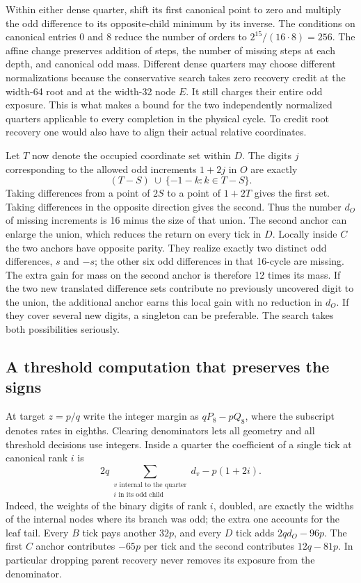 Within either dense quarter, shift its first canonical point to zero and multiply the odd difference to its opposite-child minimum by its inverse. The conditions on canonical entries 0 and 8 reduce the number of orders to \(2^{15}/(16\cdot8)=256\). The affine change preserves addition of steps, the number of missing steps at each depth, and canonical odd mass. Different dense quarters may choose different normalizations because the conservative search takes zero recovery credit at the width-64 root and at the width-32 node \(E\). It still charges their entire odd exposure. This is what makes a bound for the two independently normalized quarters applicable to every completion in the physical cycle. To credit root recovery one would also have to align their actual relative coordinates.

Let \(T\) now denote the occupied coordinate set within \(D\). The digits \(j\) corresponding to the allowed odd increments \(1+2j\) in \(O\) are exactly
\[
                   (T-S)\ \cup\ \{-1-k:k\in T-S\}.
\]
Taking differences from a point of \(2S\) to a point of \(1+2T\) gives the first set. Taking differences in the opposite direction gives the second. Thus the number \(d_O\) of missing increments is 16 minus the size of that union. The second anchor can enlarge the union, which reduces the return on every tick in \(D\). Locally inside \(C\) the two anchors have opposite parity. They realize exactly two distinct odd differences, \(s\) and \(-s\); the other six odd differences in that 16-cycle are missing. The extra gain for mass on the second anchor is therefore 12 times its mass. If the two new translated difference sets contribute no previously uncovered digit to the union, the additional anchor earns this local gain with no reduction in \(d_O\). If they cover several new digits, a singleton can be preferable. The search takes both possibilities seriously.

\subsection{A threshold computation that preserves the signs}

At target \(z=p/q\) write the integer margin as \(qP_8-pQ_8\), where the subscript denotes rates in eighths. Clearing denominators lets all geometry and all threshold decisions use integers. Inside a quarter the coefficient of a single tick at canonical rank \(i\) is
\[
 2q\!\sum_{\substack{v\text{ internal to the quarter}\\i\text{ in its odd child}}}\!d_v
                     -p(1+2i).
\]
Indeed, the weights of the binary digits of rank \(i\), doubled, are exactly the widths of the internal nodes where its branch was odd; the extra one accounts for the leaf tail. Every \(B\) tick pays another \(32p\), and every \(D\) tick adds \(2q d_O-96p\). The first \(C\) anchor contributes \(-65p\) per tick and the second contributes \(12q-81p\). In particular dropping parent recovery never removes its exposure from the denominator.

